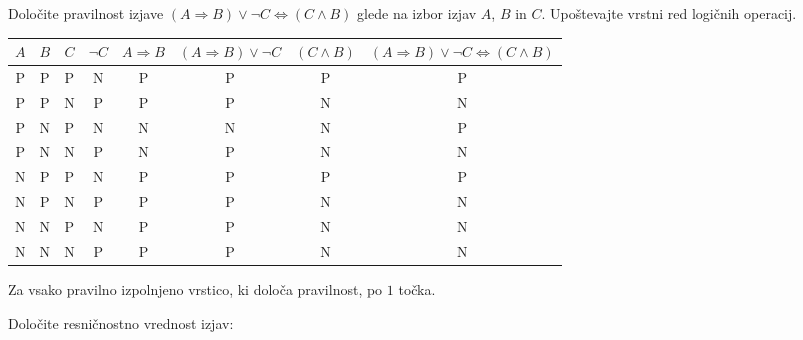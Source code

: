 \documentclass[addpoints]{exam}
\begin{document}
\begin{questions}

    
    \question[8]
    Določite pravilnost izjave $(A\Rightarrow  B)\lor \lnot C \Leftrightarrow (C\land B)$ glede na izbor izjav $A$, $B$ in $C$. Upoštevajte vrstni red logičnih operacij.

    \begin{solution}[10cm]
        \begin{table}[H]
            \begin{tabular}{cccccccc}
             $A$ & $B$ & $C$ & $\lnot C$ & $A\Rightarrow B$ & $(A\Rightarrow B)\lor\lnot C$ & $(C\land B)$ & $(A\Rightarrow  B)\lor \lnot C \Leftrightarrow (C\land B)$\\ \hline
             P & P & P & N & P & P & P & P \\ 
             P & P & N & P & P & P & N & N \\
             P & N & P & N & N & N & N & P \\
             P & N & N & P & N & P & N & N \\
             N & P & P & N & P & P & P & P \\ 
             N & P & N & P & P & P & N & N \\
             N & N & P & N & P & P & N & N \\
             N & N & N & P & P & P & N & N
            \end{tabular}
        \end{table}
        Za vsako pravilno izpolnjeno vrstico, ki določa pravilnost, po $1$ točka.
    \end{solution}




    \question[3]
    Določite resničnostno vrednost izjav:


\end{questions}
\end{document}
